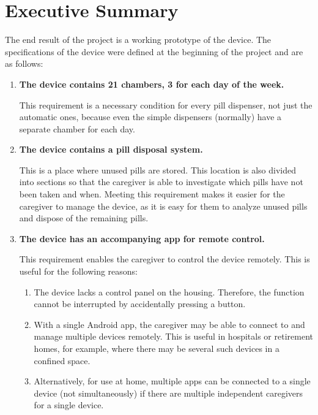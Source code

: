 \section*{Executive Summary}
The end result of the project is a working prototype of the device. The specifications of the device were defined at the beginning of the project and are as follows:
\begin{enumerate}
\item{\textbf{The device contains 21 chambers, 3 for each day of the week.}} 

This requirement is a necessary condition for every pill dispenser, not just the automatic ones, because even the simple dispensers (normally) have a separate chamber for each day.
\item{\textbf{The device contains a pill disposal system.}}

 This is a place where unused pills are stored. This location is also divided into sections so that the caregiver is able to investigate which pills have not been taken and when. Meeting this requirement makes it easier for the caregiver to manage the device, as it is easy for them to analyze unused pills and dispose of the remaining pills.
 
\item{\textbf{The device has an accompanying app for remote control.}} 

This requirement enables the caregiver to control the device remotely. This is useful for the following reasons:

\begin{enumerate}
	\item The device lacks a control panel on the housing. Therefore, the function cannot be interrupted by accidentally pressing a button.
	\item With a single Android app, the caregiver may be able to connect to and manage multiple devices remotely. This is useful in hospitals or retirement homes, for example, where there may be several such devices in a confined space.
	\item Alternatively, for use at home, multiple apps can be connected to a single device (not simultaneously) if there are multiple independent caregivers for a single device.
\end{enumerate}
\end{enumerate}


